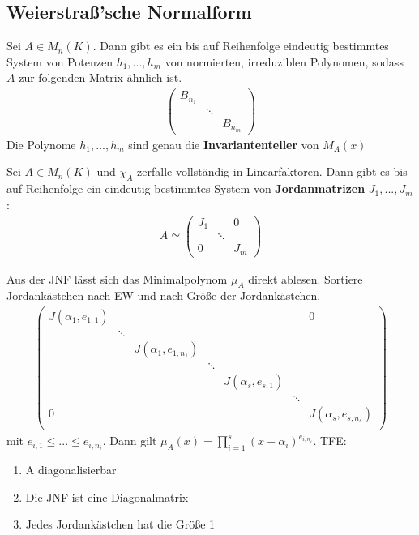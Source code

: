 \subsection{Weierstraß'sche Normalform}
\begin{theorem}
Sei $A \in M_n(K)$. Dann gibt es ein bis auf Reihenfolge eindeutig bestimmtes System von Potenzen $h_1,...,h_m$ von normierten, irreduziblen Polynomen, sodass $A$ zur folgenden Matrix ähnlich ist.
\begin{align*}
\begin{pmatrix}
B_{n_1} &        & \\
        & \ddots & \\
        &		  & B_{n_m}
\end{pmatrix}
\end{align*}
Die Polynome $h_1,...,h_m$ sind genau die \textbf{Invariantenteiler} von $M_A(x)$
\end{theorem}

\begin{theorem}
Sei $A \in M_n(K)$ und $\chi_A$ zerfalle vollständig in Linearfaktoren. Dann gibt es bis auf Reihenfolge ein eindeutig bestimmtes System von \textbf{Jordanmatrizen} $J_1,...,J_m$:
\begin{align*}
A \simeq 
\begin{pmatrix}
J_1 & & 0\\
    & \ddots & \\
0   &        & J_m
\end{pmatrix}
\end{align*}
\end{theorem}
\begin{remark}
Aus der JNF lässt sich das Minimalpolynom $\mu_A$ direkt ablesen. Sortiere Jordankästchen nach EW und nach Größe der Jordankästchen.
\begin{align*}
\begin{pmatrix}
J(\alpha_1,e_{1,1}) & & & & & & 0\\
& \ddots & & & & & \\
 & & J(\alpha_1,e_{1,n_1}) & & & & \\
 & & & \ddots & & & \\
 & & & & J(\alpha_s,e_{s,1}) & &\\
 & & & & & \ddots & \\
0 & & & & & & J(\alpha_s,e_{s,n_s}) \\
\end{pmatrix}
\end{align*}
mit $e_{i,1} \leq ... \leq e_{i,n_i}$. Dann gilt $\mu_A(x)=\prod \limits_{i=1}^s (x-\alpha_i)^{e_{i,n_i}}$. TFE:
\begin{enumerate}
	\item A diagonalisierbar
	\item Die JNF ist eine Diagonalmatrix
	\item Jedes Jordankästchen hat die Größe 1
\end{enumerate}
\end{remark}

